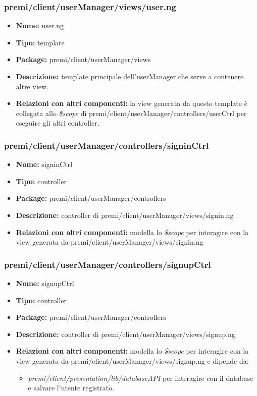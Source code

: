 \subsubsection{premi/client/userManager/views/user.ng}
\begin{itemize}
  \item[] \textbf{Nome:} user.ng
  \item[] \textbf{Tipo:} template
  \item[] \textbf{Package:} premi/client/userManager/views
  \item[] \textbf{Descrizione:} template principale dell'userManager che serve a contenere altre view.
  \item[] \textbf{Relazioni con altri componenti:} la view generata da questo template è collegata allo \textit{\$scope} di premi/client/userManager/controllers/userCtrl per eseguire gli altri controller.
\end{itemize}

\subsubsection{premi/client/userManager/controllers/signinCtrl}
\begin{itemize}
  \item[] \textbf{Nome:} signinCtrl
  \item[] \textbf{Tipo:} controller
  \item[] \textbf{Package:} premi/client/userManager/controllers
  \item[] \textbf{Descrizione:} controller di premi/client/userManager/views/signin.ng
  \item[] \textbf{Relazioni con altri componenti:} modella lo \textit{\$scope} per interagire con la view generata da premi/client/userManager/views/signin.ng
\end{itemize}

\subsubsection{premi/client/userManager/controllers/signupCtrl}
\begin{itemize}
  \item[] \textbf{Nome:} signupCtrl
  \item[] \textbf{Tipo:} controller
  \item[] \textbf{Package:} premi/client/userManager/controllers
  \item[] \textbf{Descrizione:} controller di premi/client/userManager/views/signup.ng
  \item[] \textbf{Relazioni con altri componenti:} modella lo \textit{\$scope} per interagire con la view generata da premi/client/userManager/views/signup.ng e dipende da:
  \begin{itemize}
   \item \textit{premi/client/presentation/lib/databaseAPI} per interagire con il database e salvare l'utente registrato.
  \end{itemize}
\end{itemize}

